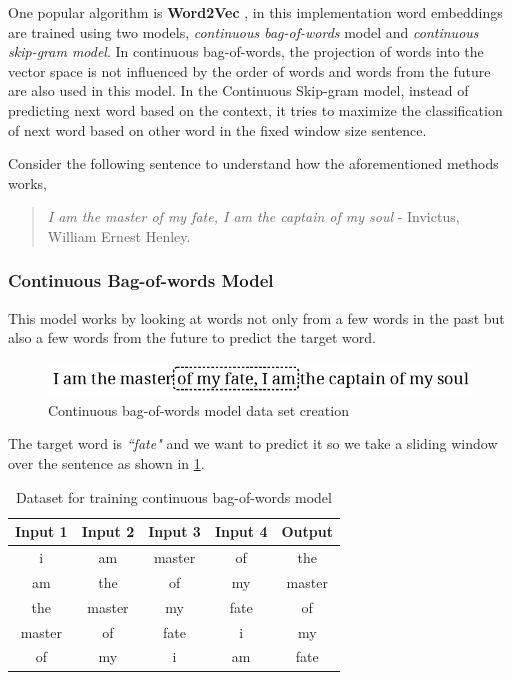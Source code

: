 One popular algorithm is \textbf{Word2Vec} \cite{mikolov2013efficient}, in this implementation word embeddings are trained using two models, \textit{continuous bag-of-words} model and \textit{continuous skip-gram model}. In continuous bag-of-words, the projection of words into the vector space is not influenced by the order of words and words from the future are also used in this model. In the Continuous Skip-gram model, instead of predicting next word based on the context, it tries to maximize the classification of next word based on other word in the fixed window size sentence.

Consider the following sentence to understand how the aforementioned methods works,

\begin{quote}
    \textit{I am the master of my fate, I am the captain of my soul} - Invictus, William Ernest Henley.
\end{quote}

\subsubsection*{Continuous Bag-of-words Model}
This model works by looking at words not only from a few words in the past but also a few words from the future to predict the target word. 

\begin{figure}[!ht]
    \centering
    \includegraphics[width=12cm]{pics/bag-of-wordWord2Vec.jpg}
    \caption{Continuous bag-of-words model data set creation}
    \label{fig:word2VecBagOfWords}
\end{figure}

The target word is \textit{``fate"} and we want to predict it so we take a sliding window over the sentence as shown in \ref{fig:word2VecBagOfWords}. 

\begin{table}[!ht]
\centering
\begin{tabular}{ccccc}
\hline
\multicolumn{1}{l}{\textbf{Input 1}} & \multicolumn{1}{l}{\textbf{Input 2}} & \textbf{Input 3} & \multicolumn{1}{l}{\textbf{Input 4}} & \textbf{Output} \\ \hline
i & am & master & of & the \\ \hline
am & the & of & my & master \\ \hline
the & master & my & fate & of \\ \hline
master & of & fate & i & my \\ \hline
of & my & i & am & fate \\ \hline
\end{tabular}
\caption{Dataset for training continuous bag-of-words model}
\label{datasetBagOfWords}
\end{table}

